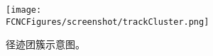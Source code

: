 \begin{figure}[H]
\centering
\texttt{[image: \\FCNCFigures/screenshot/trackCluster.png]}
\caption{径迹团簇示意图。}
\label{fig:trackCluster}
\end{figure}